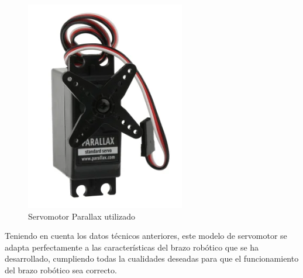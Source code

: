 \begin{figure}[H]
    \centering 
    \includegraphics[width=.35\linewidth]{pictures/ServoParallax.PNG}
    \caption{Servomotor Parallax utilizado \cite{90000005ServomotorParallax}}
    \label{fig:}
\end{figure}

Teniendo en cuenta los datos técnicos anteriores, este modelo de servomotor se adapta perfectamente a las características del brazo robótico que se ha desarrollado, cumpliendo todas la cualidades deseadas para que el funcionamiento del brazo robótico sea correcto.